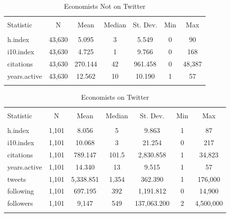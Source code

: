 \documentclass[12pt, Times New Roman]{article}
\begin{document}
\begin{table}[!htbp] \centering 
  \caption{Economists Not on Twitter} 
  \label{table2} 
\begin{tabular}{@{\extracolsep{5pt}}lcccccc} 
\\[-1.8ex]\hline 
\hline \\[-1.8ex] 
Statistic & \multicolumn{1}{c}{N} & \multicolumn{1}{c}{Mean} & \multicolumn{1}{c}{Median} & \multicolumn{1}{c}{St. Dev.} & \multicolumn{1}{c}{Min} & \multicolumn{1}{c}{Max} \\ 
\hline \\[-1.8ex] 
h.index & 43,630 & 5.095 & 3 & 5.549 & 0 & 90 \\ 
i10.index & 43,630 & 4.725 & 1 & 9.766 & 0 & 168 \\ 
citations & 43,630 & 270.144 & 42 & 961.458 & 0 & 48,387 \\ 
years.active & 43,630 & 12.562 & 10 & 10.190 & 1 & 57 \\ 
\hline \\[-1.8ex] 
\end{tabular} 
\end{table} 


\begin{table}[!htbp] \centering 
  \caption{Economists on Twitter} 
  \label{table3} 
\begin{tabular}{@{\extracolsep{5pt}}lcccccc} 
\\[-1.8ex]\hline 
\hline \\[-1.8ex] 
Statistic & \multicolumn{1}{c}{N} & \multicolumn{1}{c}{Mean} & \multicolumn{1}{c}{Median} & \multicolumn{1}{c}{St. Dev.} & \multicolumn{1}{c}{Min} & \multicolumn{1}{c}{Max} \\ 
\hline \\[-1.8ex] 
h.index & 1,101 & 8.056 & 5 & 9.863 & 1 & 87 \\ 
i10.index & 1,101 & 10.068 & 3 & 21.254 & 0 & 217 \\ 
citations & 1,101 & 789.147 & 101.5 & 2,830.858 & 1 & 34,823 \\ 
years.active & 1,101 & 14.340 & 13 & 9.515 & 1 & 57 \\ 
tweets & 1,101 & 5,338.851 & 1,354 & 362.390 & 1 & 176,000 \\ 
following & 1,101 & 697.195 & 392 & 1,191.812 & 0 & 14,900 \\ 
followers & 1,101 & 9,147 & 549 & 137,063.200 & 2 & 4,500,000 \\ 
\hline \\[-1.8ex] 
\end{tabular} 
\end{table}
\end{document}
